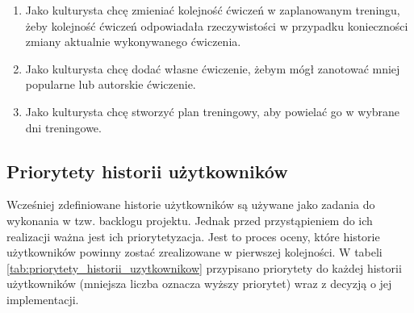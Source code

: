 \documentclass{article}
\begin{document}
\begin{enumerate}
                  \item Jako kulturysta chcę zmieniać kolejność ćwiczeń w zaplanowanym treningu, żeby kolejność ćwiczeń odpowiadała rzeczywistości w przypadku konieczności zmiany aktualnie wykonywanego ćwiczenia.
                  \item Jako kulturysta chcę dodać własne ćwiczenie, żebym mógł zanotować mniej popularne lub autorskie ćwiczenie.
                  \item Jako kulturysta chcę stworzyć plan treningowy, aby powielać go w wybrane dni treningowe.
            \end{enumerate}

      \subsection{Priorytety historii użytkowników}
            Wcześniej zdefiniowane historie użytkowników są używane jako zadania do wykonania w tzw. backlogu projektu. Jednak przed przystąpieniem do ich realizacji ważna jest ich priorytetyzacja. Jest to proces oceny, które historie użytkowników powinny zostać zrealizowane w pierwszej kolejności. W tabeli \ref{tab:priorytety_historii_uzytkownikow} przypisano priorytety do każdej historii użytkowników (mniejsza liczba oznacza wyższy priorytet) wraz z decyzją o jej implementacji.
\end{document}
